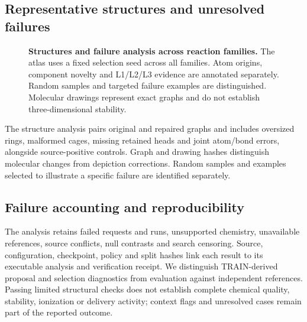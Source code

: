 \subsection{Representative structures and unresolved failures}
\begin{figure}[H]\centering
{}\hfill
{}
\caption{\textbf{Structures and failure analysis across reaction families.} The atlas uses a fixed selection seed across all families. Atom origins, component novelty and L1/L2/L3 evidence are annotated separately. Random samples and targeted failure examples are distinguished. Molecular drawings represent exact graphs and do not establish three-dimensional stability.}
\label{fig:22-atlas}\end{figure}
The structure analysis pairs original and repaired graphs and includes oversized rings, malformed
cages, missing retained heads and joint atom/bond errors, alongside source-positive controls.
Graph and drawing hashes distinguish molecular changes from depiction corrections. Random samples
and examples selected to illustrate a specific failure are identified separately.

\subsection{Failure accounting and reproducibility}
The analysis retains failed requests and runs, unsupported chemistry, unavailable references,
source conflicts, null contrasts and search censoring. Source, configuration, checkpoint, policy and
split hashes link each result to its executable analysis and verification receipt. We distinguish
TRAIN-derived proposal and selection diagnostics from evaluation against independent references.
Passing limited structural checks does not establish complete chemical quality, stability, ionization
or delivery activity; context flags and unresolved cases remain part of the reported outcome.

